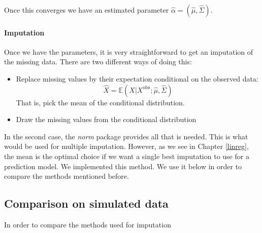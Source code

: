 Once this converges we have an estimated parameter $\hat{\alpha} = (\hat{\mu}, \hat{\Sigma})$.

\paragraph{Imputation}
Once we have the parameters, it is very straightforward to get an imputation of the missing data. There are two different ways of doing this:
\begin{itemize}
\item Replace missing values by their expectation conditional on the observed data: 
$$\hat{X} = \mathbb{E}(X \vert X^{\text{obs}} ; \hat{\mu}, \hat{\Sigma})$$
That is, pick the mean of the conditional distribution.
\item Draw the missing values from the conditional distribution
\end{itemize}

In the second case, the \emph{norm} package provides all that is needed. This is what would be used for multiple imputation. However, as we see in Chapter \ref{linreg}, the mean is the optimal choice if we want a single best imputation to use for a prediction model. We implemented this method. We use it below in order to compare the methods mentioned before.

		\subsection{Comparison on simulated data}
In order to compare the methods used for imputation
		
